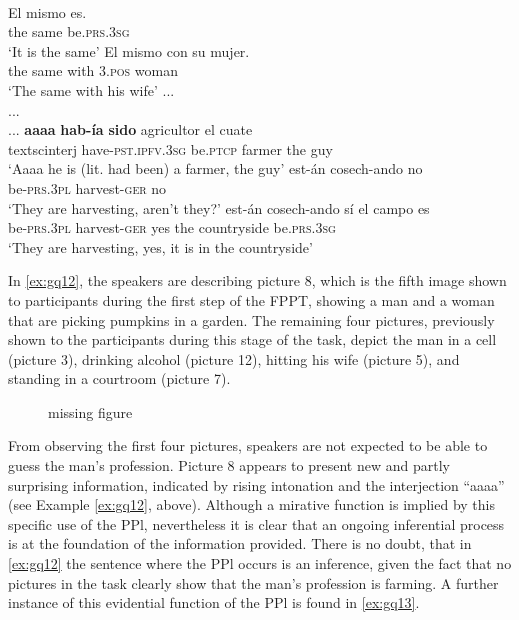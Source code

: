\documentclass[output=paper]{langsci/langscibook}
\begin{document}
\ea \label{ex:gq12}
\\
	\ea \label{ex:gq12a}
	\gll El mismo es.\\
	the same be.\textsc{prs.3sg}\\
	\glt ‘It is the same’
	\ex \label{ex:gq12b}
	\gll  El mismo con su mujer.\\
	the same with \textsc{3.pos} woman\\
	\glt ‘The same with his wife’
	\ex  \label{ex:gq12c}
	\gll ...\\
	{...}\\
	\glt ...
	\ex \label{ex:gq12d}
	\gll \textbf{aaaa} \textbf{hab-ía} \textbf{sido} agricultor el cuate\\
	textsc{interj} have-\textsc{pst.ipfv.3sg} be.\textsc{ptcp} farmer the guy\\
	\glt ‘Aaaa he is (lit. had been) a farmer, the guy’
	\ex \label{ex:gq12e}
	\gll est-án cosech-ando no\\
	be-\textsc{prs.3pl} harvest-\textsc{ger} no\\
	\glt ‘They are harvesting, aren’t they?’
	\ex \label{ex:gq12f}
	\gll est-án cosech-ando sí el  campo es\\
	be-\textsc{prs.3pl} harvest-\textsc{ger} yes the countryside be.\textsc{prs.3sg}\\
	\glt ‘They are harvesting, yes, it is in the countryside’
	\z
\z

In \ref{ex:gq12}, the speakers are describing picture 8, which is the fifth image shown to participants during the first step of the FPPT, showing a man and a woman that are picking pumpkins in a garden. The remaining four pictures, previously shown to the participants during this stage of the task, depict the man in a cell (picture 3), drinking alcohol (picture 12), hitting his wife (picture 5), and standing in a courtroom (picture 7). %


\begin{figure} 
\missingfigure{~}
  \caption{missing figure}
  \label{fig:gq2}
\end{figure}


From observing the first four pictures, speakers are not expected to be able to guess the man’s profession. Picture 8 appears to present new and partly surprising information, indicated by rising intonation and the interjection “aaaa” (see Example \ref{ex:gq12}, above). Although a mirative function is implied by this specific use of the PPl, nevertheless it is clear that an ongoing inferential process is at the foundation of the information provided. There is no doubt, that in \ref{ex:gq12} the sentence where the PPl occurs is an inference, given the fact that no pictures in the task clearly show that the man’s profession is farming. A further instance of this evidential function of the PPl is found in \ref{ex:gq13}. 
\end{document}
